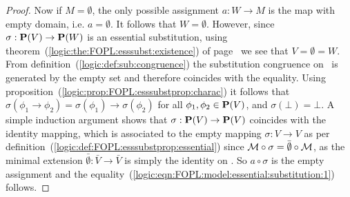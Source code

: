 \begin{proof}
Now if $M=\emptyset$, the only possible assignment $a:W\to M$ is the
map with empty domain, i.e. $a=\emptyset$. It follows that
$W=\emptyset$. However, since $\sigma:\mbox{${\bf P}(V)$}\to{\bf P}(W)$ is an
essential substitution, using
theorem~(\ref{logic:the:FOPL:esssubst:existence}) of
page~\pageref{logic:the:FOPL:esssubst:existence} we see that
$V=\emptyset=W$. From definition~(\ref{logic:def:sub:congruence})
the substitution congruence on \pv\ is generated by the empty set
and therefore coincides with the equality. Using
proposition~(\ref{logic:prop:FOPL:esssubstprop:charac}) it follows
that
$\sigma(\phi_{1}\to\phi_{2})=\sigma(\phi_{1})\to\sigma(\phi_{2})$
for all $\phi_{1},\phi_{2}\in\mbox{${\bf P}(V)$}$, and $\sigma(\bot)=\bot$. A simple
induction argument shows that $\sigma:\mbox{${\bf P}(V)$}\to\mbox{${\bf P}(V)$}$ coincides with the
identity mapping, which is associated to the empty mapping
$\sigma:V\to V$ as per
definition~(\ref{logic:def:FOPL:esssubstprop:essential}) since
${\cal M}\circ\sigma=\bar{\emptyset}\circ{\cal M}$, as the minimal
extension $\bar{\emptyset}:\bar{V}\to\bar{V}$ is simply the identity
on \N. So $a\circ\sigma$ is the empty assignment and the
equality~(\ref{logic:eqn:FOPL:model:essential:substitution:1})
follows.
\end{proof}
